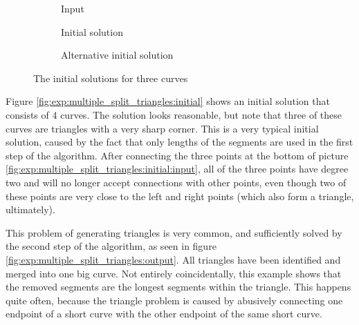\documentclass[11pt]{article}
\begin{document}
\begingroup
{}%
\begin{figure}[ht!]
\centering
\begin{subfigure}{.33\linewidth}
\centering

\caption{Input}
\label{fig:exp:multiple_initial:input}
\end{subfigure}%
\begin{subfigure}{.33\linewidth}
\centering

\caption{Initial solution}
\label{fig:exp:multiple_initial:initial}
\end{subfigure}%
\begin{subfigure}{.33\linewidth}
\centering

\caption{Alternative initial solution}
\label{fig:exp:multiple_initial:alternative}
\end{subfigure}
\caption{The initial solutions for three curves}
\label{fig:exp:multiple_initial}
\end{figure}
\endgroup

Figure \ref{fig:exp:multiple_split_triangles:initial} shows an initial solution that consists of 4 curves. The solution looks reasonable, but note that three of these curves are triangles with a very sharp corner. This is a very typical initial solution, caused by the fact that only lengths of the segments are used in the first step of the algorithm. After connecting the three points at the bottom of picture \ref{fig:exp:multiple_split_triangles:initial:input}, all of the three points have degree two and will no longer accept connections with other points, even though two of these points are very close to the left and right points (which also form a triangle, ultimately).

This problem of generating triangles is very common, and sufficiently solved by the second step of the algorithm, as seen in figure \ref{fig:exp:multiple_split_triangles:output}. All triangles have been identified and merged into one big curve. Not entirely coincidentally, this example shows that the removed segments are the longest segments within the triangle. This happens quite often, because the triangle problem is caused by abusively connecting one endpoint of a short curve with the other endpoint of the same short curve.
\end{document}
